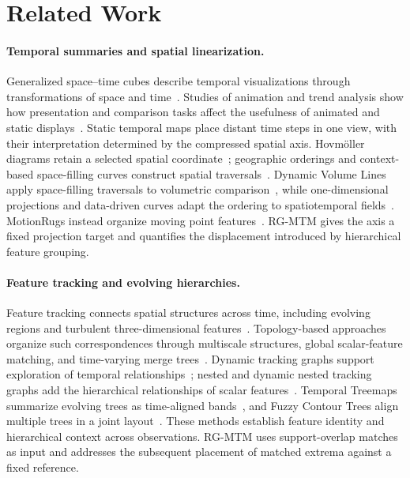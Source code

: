 \section{Related Work}
\paragraph{Temporal summaries and spatial linearization.}
Generalized space--time cubes describe temporal visualizations through transformations of space and time~\cite{Bach:2017:STC}. Studies of animation and trend analysis show how presentation and comparison tasks affect the usefulness of animated and static displays~\cite{Tversky:2002:Animation,Robertson:2008:Animation}. Static temporal maps place distant time steps in one view, with their interpretation determined by the compressed spatial axis. Hovm\"oller diagrams retain a selected spatial coordinate~\cite{Hovmoller:1949}; geographic orderings and context-based space-filling curves construct spatial traversals~\cite{Guo:2006:SpatialOrder,Dafner:2000:CSFC}. Dynamic Volume Lines apply space-filling traversals to volumetric comparison~\cite{Weissenboeck:2019:DVL}, while one-dimensional projections and data-driven curves adapt the ordering to spatiotemporal fields~\cite{Franke:2021:1DP,Zhou:2021:DSF}. MotionRugs instead organize moving point features~\cite{Buchmueller:2019:MR}. RG-MTM gives the axis a fixed projection target and quantifies the displacement introduced by hierarchical feature grouping.

\paragraph{Feature tracking and evolving hierarchies.}
Feature tracking connects spatial structures across time, including evolving regions and turbulent three-dimensional features~\cite{Samtaney:1994:Tracking,Silver:1997:Tracking}. Topology-based approaches organize such correspondences through multiscale structures, global scalar-feature matching, and time-varying merge trees~\cite{Bremer:2010:Burning,Saikia:2017:GFT,Oesterling:2017:TVMT}. Dynamic tracking graphs support exploration of temporal relationships~\cite{Widanagamaachchi:2012:DTG}; nested and dynamic nested tracking graphs add the hierarchical relationships of scalar features~\cite{Lukasczyk:2017:NTG,Lukasczyk:2020:DNTG}. Temporal Treemaps summarize evolving trees as time-aligned bands~\cite{Koepp:2019:TT}, and Fuzzy Contour Trees align multiple trees in a joint layout~\cite{Lohfink:2020:FCT}. These methods establish feature identity and hierarchical context across observations. RG-MTM uses support-overlap matches as input and addresses the subsequent placement of matched extrema against a fixed reference.


